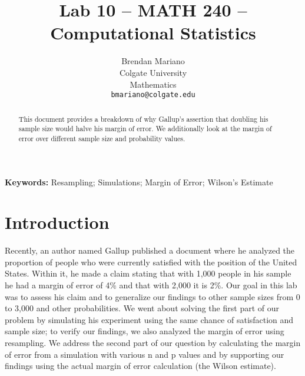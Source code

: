 \documentclass{article}\usepackage[]{graphicx}\usepackage[]{xcolor}
\newenvironment{Figure}
  {\par\medskip\noindent\minipage{\linewidth}}
  {\endminipage\par\medskip}
\begin{document}
\vspace{-1in}
\title{Lab 10 -- MATH 240 -- Computational Statistics}

\author{
  Brendan Mariano \\
  Colgate University  \\
  Mathematics  \\
  {\tt bmariano@colgate.edu}
}

\date{}

\maketitle

\begin{multicols}{2}
\begin{abstract}
This document provides a breakdown of why Gallup's assertion that doubling his sample size would halve his margin of error. We additionally look at the margin of error over different sample size and probability values.
\end{abstract}

\noindent \textbf{Keywords:} Resampling; Simulations; Margin of Error; Wilson's Estimate

\section{Introduction}
Recently, an author named Gallup published a document where he analyzed the proportion of people who were currently satisfied with the position of the United States. Within it, he made a claim stating that with 1,000 people in his sample he had a margin of error of 4\% and that with 2,000 it is 2\%. Our goal in this lab was to assess his claim and to generalize our findings to other sample sizes from 0 to 3,000 and other probabilities. We went about solving the first part of our problem by simulating his experiment using the same chance of satisfaction and sample size; to verify our findings, we also analyzed the margin of error using resampling. We  address the second part of our question by calculating the margin of error from a simulation with various n and p values and by supporting our findings using the actual margin of error calculation (the Wilson estimate). 





\end{multicols}
\end{document}
